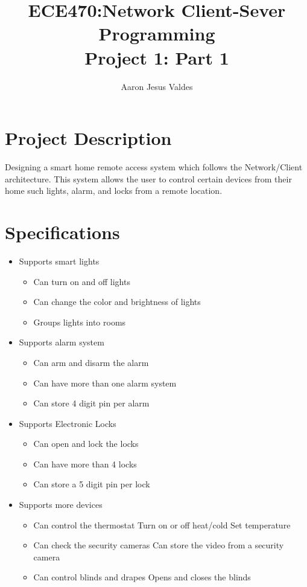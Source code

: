 \documentclass[11pt]{article}
\title{\Huge{ECE470:Network Client-Sever Programming}\\\LARGE{Project 1: Part 1}}
\author{Aaron Jesus Valdes}
\begin{document}
	\maketitle
	\clearpage
	\onehalfspacing
	\clearpage
	\section*{Project Description}
	Designing a smart home remote access system which follows the Network/Client architecture. This system allows the user to control certain devices from their home such lights, alarm, and locks from a remote location.
	\section*{Specifications}
		\begin{itemize}
			\item Supports smart lights
				\begin{itemize}
					\item Can turn on and off lights
					\item Can change the color and brightness of lights
					\item Groups lights into rooms
				\end{itemize}
			\item Supports alarm system
				\begin{itemize}
					\item Can arm and disarm the alarm
					\item Can have more than one alarm system
					\item Can store 4 digit pin per alarm 
				\end{itemize}
			\item Supports Electronic Locks
				\begin{itemize}
					\item Can open and lock the locks
					\item Can have more than 4 locks
					\item Can store a 5 digit pin per lock
				\end{itemize}
			\item Supports more devices
				\begin{itemize}
					\item Can control the thermostat
						\subitem Turn on or off heat/cold
						\subitem Set temperature
					\item Can check the security cameras
						\subitem Can store the video from a security camera
					\item Can control blinds and drapes
						\subitem Opens and closes the blinds
				\end{itemize}
		\end{itemize}
\end{document}
